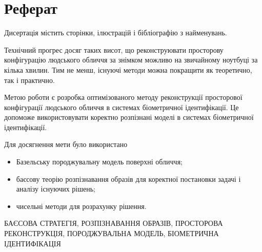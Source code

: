 \chapter*{Реферат}

Дисертація містить \pageref{LastPage} сторінки,
 ілюстрацій
і бібліографію з  найменувань.

Технічний прогрес досяг таких висот,
що реконструювати просторову конфігурацію людського обличчя за знімком
можливо на звичайному ноутбуці за кілька хвилин.
Тим не менш, існуючі методи можна покращити як теоретично, так і практично.

Метою роботи є
розробка оптимізованого методу реконструкції просторової конфігурації
людського обличчя в системах біометричної ідентифікації.
Це допоможе використовувати коректно розпізнані моделі
в системах біометричної ідентифікації.

Для досягнення мети було використано
\begin{itemize}
  \item
    Базельську породжувальну модель поверхні обличчя;
  \item
    баєсову теорію розпізнавання образів
    для коректної постановки задачі і аналізу існуючих рішень;
  \item
    чисельні методи для розрахунку рішення.
\end{itemize}

\MakeUppercase{баєсова стратегія, розпізнавання образів,
просторова реконструкція, породжувальна модель,
біометрична ідентифікація}
